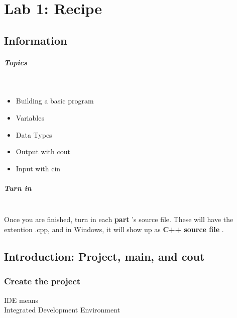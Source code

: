 \documentclass[a4paper,12pt]{book}
\title{}
\author{Rachel Morris}
\date{\today}
\begin{document}
    \chapter*{Lab 1: Recipe} 
        \section*{Information}

                \paragraph*{ Topics } ~\\
                    \begin{itemize}
                        \item Building a basic program
                        \item Variables
                        \item Data Types
                        \item Output with cout
                        \item Input with cin
                    \end{itemize}
                    
                \paragraph*{ Turn in } ~\\
                    Once you are finished, turn in each \textbf{ part }'s source file. These will
                    have the extention .cpp, and in Windows, it will show up as \textbf{ C++ source file }.







        \section*{ Introduction: Project, main, and cout }
            \subsection*{ Create the project }

\begin{WrapTextSide}
    IDE means \\ Integrated Development Environment
\end{WrapTextSide}
            
\end{document}
